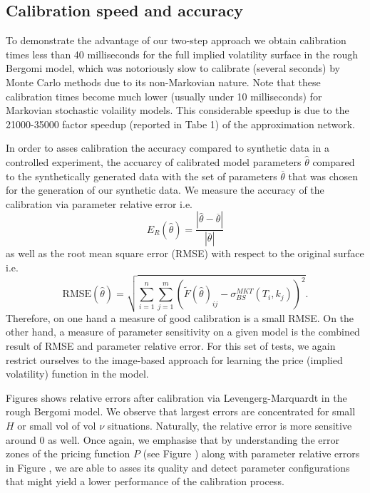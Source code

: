 \documentclass{article}
\theoremstyle{remark}
\begin{document}
\subsection{Calibration speed and accuracy}
\label{sec:calibr-speed-accur}
To demonstrate the advantage of our two-step approach we obtain calibration times less than 40 milliseconds for the full implied volatility surface in the rough Bergomi model, which was notoriously slow to calibrate (several seconds) by Monte Carlo methods due to its non-Markovian nature. Note that these calibration times become much lower (usually under 10 milliseconds) for Markovian stochastic volaility models. This considerable speedup is due to the 21000-35000 factor speedup (reported in Tabe 1) of the approximation network.

In order to asses calibration the accuracy compared to synthetic data in a
controlled experiment, the accuarcy of calibrated model parameters
$\widehat{\theta}$ compared to the synthetically generated data with the set
of parameters $\overline{\theta}$ that was chosen for the generation of our
synthetic data. We measure the accuracy of the calibration via parameter
relative error i.e.
\begin{equation*}
  E_R(\widehat{\theta})=
  \frac{|\widehat{\theta}-\overline{\theta}|}{|\overline{\theta}|}
\end{equation*}
as well as the root mean square error (RMSE) with respect to the original surface i.e.
\begin{equation*}
  \text{RMSE}(\widehat{\theta})=\sqrt{\sum_{i=1}^n 
    \sum_{j=1}^m(\widetilde{F}(\widehat{\theta})_{ij}-\sigma^{MKT}_{BS}(T_i,k_j))^2}.
\end{equation*}
Therefore, on one hand a measure of good calibration is a small RMSE. On the
other hand, a measure of parameter sensitivity on a given model is the
combined result of RMSE and parameter relative error. For this set of tests,
we again restrict ourselves to the image-based approach for learning the price
(implied volatility) function in the model.

Figures shows relative errors after calibration via
Levengerg-Marquardt in the rough Bergomi model. We observe that largest errors
are concentrated for small $H$ or small vol of vol $\nu$
situations. Naturally, the relative error is more sensitive around $0$ as
well. Once again, we emphasise that by understanding the error zones of the
pricing function $P$ (see Figure ) along with parameter
relative errors in Figure , we are able to asses its quality
and detect parameter configurations that might yield a lower performance of
the calibration process. 
\end{document}
